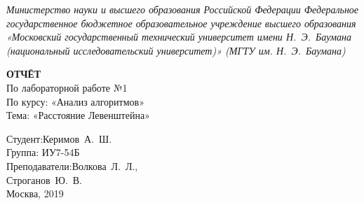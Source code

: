 \begin{titlepage}
	\centering

	{\footnotesize\itshape Министерство науки и высшего образования
	Российской Федерации Федеральное государственное бюджетное
	образовательное учреждение высшего образования «Московский
	государственный технический университет имени Н.~Э.~Баумана
	(национальный исследовательский университет)» (МГТУ им. Н.~Э.~Баумана)
	\\}

	\vspace{60mm}

	\textbf{ОТЧЁТ}\\
	По лабораторной работе №1\\
	По курсу: «Анализ алгоритмов»\\
	Тема: «Расстояние Левенштейна»\\

	\vspace{60mm}

	\hspace{70mm} Студент:\hfill Керимов~А.~Ш.\\
	\hspace{70mm} Группа: \hfill ИУ7-54Б\\
	\hspace{70mm} Преподаватели:\hfill Волкова~Л.~Л.,\\
	                            \hfill Строганов~Ю.~В.\\

	\vfill
	Москва, 2019
\end{titlepage}
